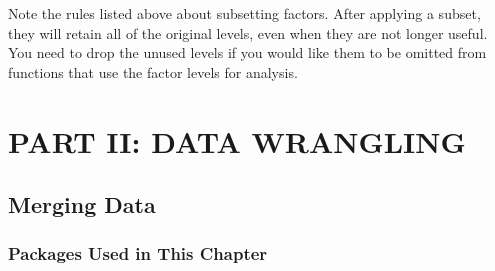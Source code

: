 \documentclass[]{book}
\newenvironment{Shaded}{\begin{snugshade}}{\end{snugshade}}
\newcommand{\CommentTok}[1]{\textcolor[rgb]{0.56,0.35,0.01}{\textit{#1}}}
\newcommand{\DataTypeTok}[1]{\textcolor[rgb]{0.13,0.29,0.53}{#1}}
\newcommand{\DecValTok}[1]{\textcolor[rgb]{0.00,0.00,0.81}{#1}}
\newcommand{\KeywordTok}[1]{\textcolor[rgb]{0.13,0.29,0.53}{\textbf{#1}}}
\newcommand{\NormalTok}[1]{#1}
\newcommand{\OperatorTok}[1]{\textcolor[rgb]{0.81,0.36,0.00}{\textbf{#1}}}
\newcommand{\StringTok}[1]{\textcolor[rgb]{0.31,0.60,0.02}{#1}}
\theoremstyle{definition}
\theoremstyle{definition}
\theoremstyle{definition}
\theoremstyle{remark}
\begin{document}
Note the rules listed above about subsetting factors. After applying a
subset, they will retain all of the original levels, even when they are
not longer useful. You need to drop the unused levels if you would like
them to be omitted from functions that use the factor levels for
analysis.

\begin{Shaded}
\end{Shaded}

\hypertarget{part-part-ii-data-wrangling}{%
\part{PART II: DATA
WRANGLING}\label{part-part-ii-data-wrangling}}

\hypertarget{merging-data}{%
\chapter{Merging Data}\label{merging-data}}

\hypertarget{packages-used-in-this-chapter}{%
\section{Packages Used in This
Chapter}\label{packages-used-in-this-chapter}}
\end{document}
